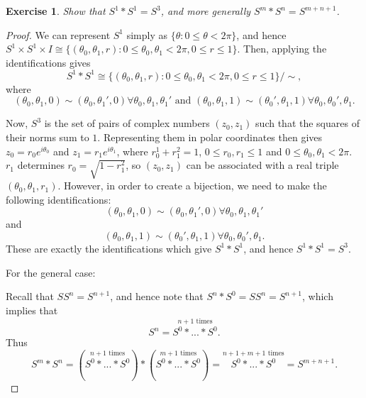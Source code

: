 \documentclass{article}
\newtheorem{exercise}{Exercise}[subsection]
\begin{document}
\begin{exercise}
Show that $S^1*S^1=S^3$, and more generally $S^m*S^n=S^{m+n+1}$.
\end{exercise}
\begin{proof}
We can represent $S^1$ simply as $\{\theta:0\leq\theta<2\pi\}$, and hence $S^1\times S^1\times I\cong \{(\theta_0,\theta_1,r):0\leq\theta_0,\theta_1<2\pi,0\leq r\leq 1\}$. Then, applying the identifications gives\[S^1*S^1\cong\{(\theta_0,\theta_1,r):0\leq\theta_0,\theta_1<2\pi,0\leq r\leq 1\}/\sim,\]where\[(\theta_0,\theta_1,0)\sim(\theta_0,\theta_1',0)\forall \theta_0,\theta_1,\theta_1'\text{ and }(\theta_0,\theta_1,1)\sim(\theta_0',\theta_1,1)\forall \theta_0,\theta_0',\theta_1.\]

Now, $S^3$ is the set of pairs of complex numbers $(z_0,z_1)$ such that the squares of their norms sum to $1$. Representing them in polar coordinates then gives $z_0=r_0 e^{i\theta_0}$ and $z_1=r_1e^{i\theta_1}$, where $r_0^1+r_1^2=1$, $0\leq r_0,r_1\leq 1$ and $0\leq\theta_0,\theta_1<2\pi$. $r_1$ determines $r_0=\sqrt{1-r_1^2}$, so $(z_0,z_1)$ can be associated with a real triple $(\theta_0,\theta_1,r_1)$. However, in order to create a bijection, we need to make the following identifications:\[(\theta_0,\theta_1,0)\sim(\theta_0,\theta_1',0)\forall \theta_0,\theta_1,\theta_1'\] and \[(\theta_0,\theta_1,1)\sim(\theta_0',\theta_1,1)\forall\theta_0,\theta_0',\theta_1.\] These are exactly the identifications which give $S^1*S^1$, and hence $S^1*S^1=S^3$.
\newline

For the general case:

\noindent Recall that $SS^n=S^{n+1}$, and hence note that $S^n*S^0=SS^n=S^{n+1}$, which implies that \[S^n=\overset{n+1\text{ times}}{S^0*...*S^0}.\] Thus \[S^m*S^n=(\overset{n+1\text{ times}}{S^0*...*S^0})*(\overset{m+1\text{ times}}{S^0*...*S^0})=\overset{n+1+m+1\text{ times}}{S^0*...*S^0}=S^{m+n+1}.\]
\end{proof}
\end{document}
